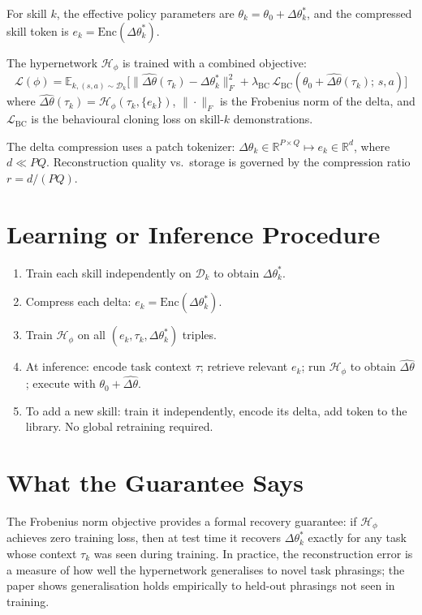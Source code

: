 \documentclass[10pt,twocolumn]{article}
\begin{document}
For skill $k$, the effective policy parameters are
$\theta_k = \theta_0 + \Delta\theta_k^*$, and the compressed skill token
is $e_k = \text{Enc}(\Delta\theta_k^*)$.

The hypernetwork $\mathcal{H}_\phi$ is trained with a combined objective:
\[
\mathcal{L}(\phi) = \mathbb{E}_{k,(s,a)\sim\mathcal{D}_k}\!\bigl[
  \|\hat{\Delta\theta}(\tau_k) - \Delta\theta_k^*\|_F^2
  + \lambda_{\text{BC}}\,\mathcal{L}_{\text{BC}}(\theta_0
    + \hat{\Delta\theta}(\tau_k);\,s,a)\bigr]
\]
where $\hat{\Delta\theta}(\tau_k) = \mathcal{H}_\phi(\tau_k, \{e_k\})$,
$\|\cdot\|_F$ is the Frobenius norm of the delta, and $\mathcal{L}_{\text{BC}}$
is the behavioural cloning loss on skill-$k$ demonstrations.

The delta compression uses a patch tokenizer:
$\Delta\theta_k \in \mathbb{R}^{P \times Q} \mapsto e_k \in \mathbb{R}^d$,
where $d \ll PQ$. Reconstruction quality vs.\ storage is governed by
the compression ratio $r = d/(PQ)$.

\section{Learning or Inference Procedure}

\begin{enumerate}[itemsep=2pt,parsep=0pt]
  \item Train each skill independently on $\mathcal{D}_k$ to obtain
    $\Delta\theta_k^*$.
  \item Compress each delta: $e_k = \text{Enc}(\Delta\theta_k^*)$.
  \item Train $\mathcal{H}_\phi$ on all $(e_k, \tau_k, \Delta\theta_k^*)$
    triples.
  \item At inference: encode task context $\tau$; retrieve relevant $e_k$;
    run $\mathcal{H}_\phi$ to obtain $\hat{\Delta\theta}$; execute with
    $\theta_0 + \hat{\Delta\theta}$.
  \item To add a new skill: train it independently, encode its delta,
    add token to the library. No global retraining required.
\end{enumerate}

\section{What the Guarantee Says}

The Frobenius norm objective provides a formal recovery guarantee: if
$\mathcal{H}_\phi$ achieves zero training loss, then at test time it recovers
$\Delta\theta_k^*$ exactly for any task whose context $\tau_k$ was seen
during training. In practice, the reconstruction error is a measure of how
well the hypernetwork generalises to novel task phrasings; the paper shows
generalisation holds empirically to held-out phrasings not seen in training.
\end{document}
